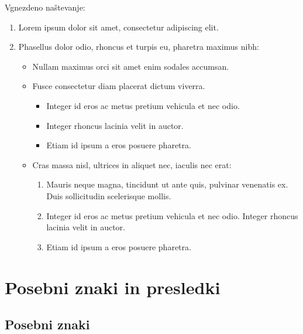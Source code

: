 \documentclass[a4paper]{article}
\begin{document}
Vgnezdeno naštevanje:
%
\begin{enumerate}
\item Lorem ipsum dolor sit amet, consectetur adipiscing elit.
\item Phasellus dolor odio, rhoncus et turpis eu, pharetra maximus nibh:
  \begin{itemize}
  \item Nullam maximus orci sit amet enim sodales accumsan.
  \item Fusce consectetur diam placerat dictum viverra.
    \begin{itemize}
    \item Integer id eros ac metus pretium vehicula et nec odio.
    \item Integer rhoncus lacinia velit in auctor.
    \item Etiam id ipsum a eros posuere pharetra.
    \end{itemize}
  \item Cras massa nisl, ultrices in aliquet nec, iaculis nec erat:
    \begin{enumerate}
    \item Mauris neque magna, tincidunt ut ante quis, pulvinar venenatis ex. Duis
      sollicitudin scelerisque mollis.
    \item Integer id eros ac metus pretium vehicula et nec odio. Integer rhoncus lacinia
      velit in auctor.
    \item Etiam id ipsum a eros posuere pharetra.
    \end{enumerate}
  \end{itemize}
\end{enumerate}

\section{Posebni znaki in presledki}

\subsection{Posebni znaki}
\end{document}
